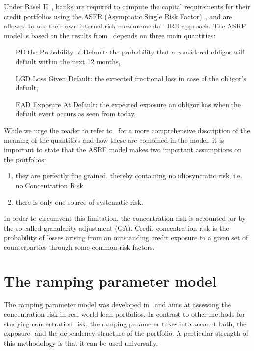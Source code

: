 \documentclass[12pt,beltcrest]{ociamthesis} %
\begin{document}
Under Basel II~\cite{basel2007explanatory}, banks are required to compute the capital requirements for their credit portfolios using the ASFR (Asymptotic Single Risk Factor)~\cite{}, and are allowed to use their own internal risk measurements - IRB approach.
The ASRF model is based on the results from~\cite{vasicek1991limiting} depends on three main quantities:
\begin{itemize}
	\item[PD] the Probability of Default: the probability that a considered obligor will default within the next 12 months,
	\item[LGD] Loss Given Default: the expected fractional loss in case of the obligor's default,
	\item[EAD] Exposure At Default: the expected exposure an obligor has when the default event occurs as seen from today.
\end{itemize}
While we urge the reader to refer to~\cite{Sindel:2009vd} for a more comprehensive description of the meaning of the quantities and how these are combined in the model, it is important to state that the ASRF model makes two important assumptions on the portfolios: 
\begin{enumerate}
	\item they are perfectly fine grained, thereby containing no idiosyncratic risk, i.e. no Concentration Risk
	\item there is only one source of systematic risk.
\end{enumerate}
In order to circumvent this limitation, the concentration risk is accounted for by the so-called granularity adjustment (GA).
Credit concentration risk is the probability of losses arising from an outstanding credit exposure to a given set of counterparties through some common risk factors.



\section{The ramping parameter model} %
\label{sec:ramping_parameter}

The ramping parameter model was developed in~\cite{Sindel:2009vd} and aims at assessing the concentration risk in real world loan portfolios. 
In contrast to other methods for studying concentration risk, the ramping parameter takes into account both, the exposure- and the dependency-structure of the portfolio.
A particular strength of this methodology is that it can be used universally.
\end{document}
